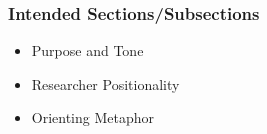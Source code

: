 \subsubsection{Intended Sections/Subsections}
\begin{itemize}[nosep]
	\item Purpose and Tone
	\item Researcher Positionality
	\item Orienting Metaphor
\end{itemize}

